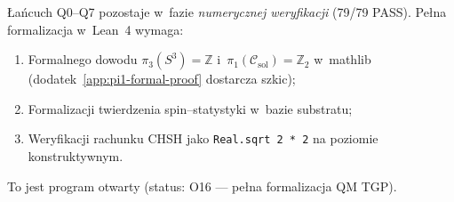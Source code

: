 \begin{problem}\label{prob:P-lean}
Łańcuch Q0--Q7 pozostaje w~fazie \emph{numerycznej weryfikacji}
(79/79 PASS). Pełna formalizacja w~Lean~4 wymaga:
\begin{enumerate}[nosep]
  \item Formalnego dowodu $\pi_3(S^3) = \mathbb{Z}$
        i~$\pi_1(\mathcal{C}_{\mathrm{sol}}) = \mathbb{Z}_2$
        w~mathlib (dodatek~\ref{app:pi1-formal-proof} dostarcza szkic);
  \item Formalizacji twierdzenia spin--statystyki w~bazie substratu;
  \item Weryfikacji rachunku CHSH jako \texttt{Real.sqrt 2 * 2}
        na poziomie konstruktywnym.
\end{enumerate}
To jest program otwarty (status: O16 --- pełna formalizacja QM TGP).
\end{problem}
